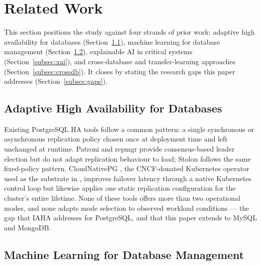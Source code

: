 \documentclass[iicol,pdflatex,sn-mathphys-num]{sn-jnl}
\theoremstyle{thmstyleone}
\theoremstyle{thmstylethree}
\begin{document}
\section{Related Work}\label{sec:related}

This section positions the study against four strands of prior work:
adaptive high availability for databases (Section~\ref{subsec:ha}),
machine learning for database management (Section~\ref{subsec:ml4db}),
explainable AI in critical systems (Section~\ref{subsec:xai}), and
cross-database and transfer-learning approaches
(Section~\ref{subsec:crossdb}). It closes by stating the research gaps
this paper addresses (Section~\ref{subsec:gaps}).

\subsection{Adaptive High Availability for Databases}\label{subsec:ha}

Existing PostgreSQL HA tools follow a common pattern: a single
synchronous or asynchronous replication policy chosen once at
deployment time and left unchanged at runtime. Patroni \cite{patroni}
and repmgr \cite{repmgr} provide consensus-based leader election but
do not adapt replication behaviour to load; Stolon \cite{stolon}
follows the same fixed-policy pattern. CloudNativePG \cite{cloudnativepg},
the CNCF-donated Kubernetes operator used as the substrate
in \cite{iaha2026}, improves failover latency through a native
Kubernetes control loop but likewise applies one static replication
configuration for the cluster's entire lifetime. None of these tools
offers more than two operational modes, and none adapts mode selection
to observed workload conditions --- the gap that IAHA \cite{iaha2026}
addresses for PostgreSQL, and that this paper extends to MySQL and
MongoDB.

\subsection{Machine Learning for Database Management}\label{subsec:ml4db}
\end{document}
